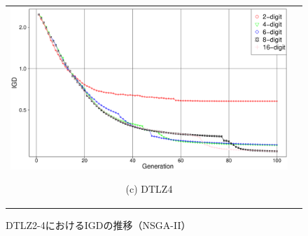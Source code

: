 \documentclass[../main/main]{subfiles}
\begin{document}
\begin{description}
\begin{figure}[htbp]
\begin{tabular}{cc}
\begin{minipage}{0.32\hsize}
\includegraphics[width=1\linewidth]{../figures/DTLZ4_IGD.eps}
\begin{center}
{\footnotesize (c) DTLZ4}
\end{center}
\end{minipage}
\end{tabular}
\caption{DTLZ2-4におけるIGDの推移（NSGA-II）}
\label{fig:igd}
\end{figure}



\end{description}
\end{document}
